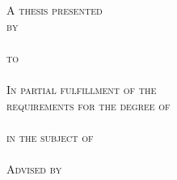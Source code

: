 \makeatletter
{
	\begin{titlepage}
		\begin{center}
			\vfill
			{\huge\bfseries\scshape\@title}\\[2ex]
			{\Large\@subtitle}\\[4ex]

			\vfill

			{
			\large
			\scshape
			A thesis presented\\
			by\\
			{\textsl{\@author}}\\
			to\\
			{\textsl\@department}\\[1em]

			In partial fulfillment of the\\
			requirements for the degree of\\
			{\textsl\@degree}\\
			in the subject of\\
			{\textsl\@subject}\\[1em]

			Advised by\\
			{\textsl\advisorlist}\\[1em]

			{\@university}\\
			{\@location}\\
			{\@date}\\
			}
		\end{center}
	\end{titlepage}
}
\makeatother
